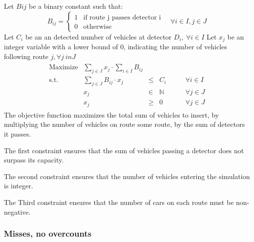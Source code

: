 Let $B{ij}$ be a binary constant such that:
\[
  B_{ij} = \begin{cases}
    1 & \text{if route j passes detector i}\\
    0 & \text{otherwise}
  \end{cases}\quad \forall i \in I, j \in J
\]
Let $C_i$ be an an detected number of vehicles at detector $D_i,\ \forall i \in I$
Let $x_j$ be an integer variable with a lower bound of 0, indicating the number of vehicles following route $j, \forall j \ in J$
\begin{align*}
  \begin{array}{rrcll}
    \text{Maximize} & \sum_{j\in J}x_j \cdot \sum_{i\in I}B_{ij}&&&\\
    \text{s.t.} & \sum_{j\in J}B_{ij}\cdot x_j & \leq & C_i & \qquad \forall i \in I\\
    & x_j & \in & \mathbb{N}&\qquad \forall j \in J\\
    & x_j & \geq & 0&\qquad \forall j \in J
  \end{array}
\end{align*}
The objective function maximizes the total sum of vehicles to insert, by multiplying the number of vehicles on route some route, by the sum of detectors it passes. 

The first constraint ensures that the sum of vehicles passing a detector does not surpass its capacity.

The second constraint ensures that the number of vehicles entering the simulation is integer.

The Third constraint ensures that the number of cars on each route must be non-negative.

\subsubsection{Misses, no overcounts}